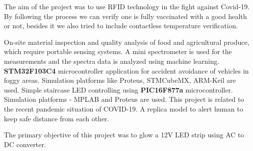 \documentclass[11pt,a4paper,sans]{moderncv}        %
\begin{document}
{The aim of the project was to use RFID technology in the fight against Covid-19. By following the process we can verify one is fully vaccinated with a good health or not, besides it we also tried to include contactless temperature verification.
}

{On-site material inspection and quality analysis of food and agricultural produce, which require portable sensing systems. A mini spectrometer is used for the measurements and the spectra data is analyzed using machine learning.
}
{\textbf{STM32F103C4} microcontroller application for accident avoidance of vehicles in foggy areas. Simulation platforms like Proteus, STMCubeMX, ARM-Keil are used.
}
{Simple staircase LED controlling using \textbf{PIC16F877a} microcontroller. Simulation platforms - MPLAB and  Proteus are used.
}
{This project is related to the recent pandemic situation of COVID-19. A replica model to alert human to keep safe distance from each other. 
}

{The primary objective of this project was to glow a 12V LED strip using AC to DC converter. 
}


\end{document}
